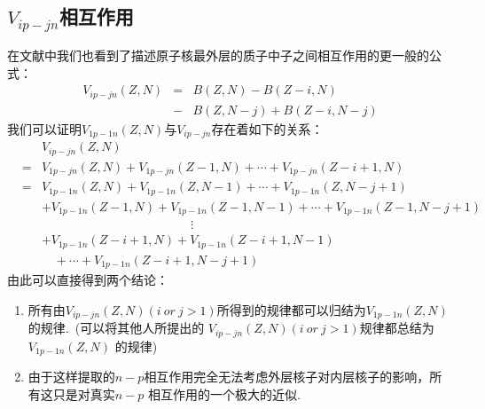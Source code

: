 \subsection{$V_{ip-jn}$相互作用}
在文献中我们也看到了描述原子核最外层的质子中子之间相互作用的更一般的公式：
\begin{eqnarray}
  V_{ip-jn}(Z,N)&=&B(Z,N)-B(Z-i,N)\nonumber\\
  &-&B(Z,N-j)+B(Z-i,N-j) \label{eq.Vipjn}
\end{eqnarray}
我们可以证明$V_{1p-1n}(Z,N)$与$V_{ip-jn}$存在着如下的关系：
\begin{eqnarray}
  &\ &V_{ip-jn}(Z,N)\nonumber\\
  &=&V_{1p-jn}(Z,N)+V_{1p-jn}(Z-1,N)+\cdots+V_{1p-jn}(Z-i+1,N)\nonumber\\
  &=&V_{1p-1n}(Z,N)+V_{1p-1n}(Z,N-1)+\cdots+V_{1p-1n}(Z,N-j+1)\nonumber\\
  &\ &+V_{1p-1n}(Z-1,N)+V_{1p-1n}(Z-1,N-1)+\cdots+V_{1p-1n}(Z-1,N-j+1)\nonumber\\
  &\ &\qquad\qquad\qquad\qquad\qquad\qquad\vdots\nonumber\\
  &\ &+V_{1p-1n}(Z-i+1,N)+V_{1p-1n}(Z-i+1,N-1)\nonumber\\
  &\ &\quad+\cdots+V_{1p-1n}(Z-i+1,N-j+1)\label{eq.Vpn}
\end{eqnarray}
由此可以直接得到两个结论：
\begin{enumerate}
\item 所有由$V_{ip-jn}(Z,N)(i\ or\ j>1)$所得到的规律都可以归结为$V_{1p-1n}(Z,N)$的规律.\ (可以将其他人所提出的 $V_{ip-jn}(Z,N)(i\ or\ j>1)$规律都总结为  $V_{1p-1n}(Z,N)$ 的规律)
\item 由于这样提取的$n-p$相互作用完全无法考虑外层核子对内层核子的影响，所有这只是对真实$n-p$ 相互作用的一个极大的近似.\
\end{enumerate}

